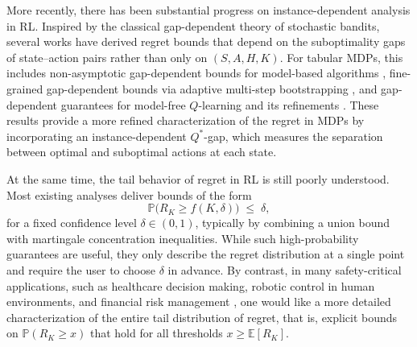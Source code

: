 \documentclass[11pt]{article}
\newcommand{\E} {\mathbb{E}}
\newcommand{\PP}{\mathbb{P}}
\begin{document}
More recently, there has been substantial progress on instance-dependent analysis in RL. Inspired by the classical gap-dependent theory of stochastic bandits, several works have derived regret bounds that depend on the suboptimality gaps of state--action pairs rather than only on $(S,A,H,K)$. For tabular MDPs, this includes non-asymptotic gap-dependent bounds for model-based algorithms \citep{simchowitz2019non}, fine-grained gap-dependent bounds via adaptive multi-step bootstrapping \citep{xu2021fine}, and gap-dependent guarantees for model-free $Q$-learning and its refinements \citep{yang2021q,velegkas2022reinforcement,zheng2025gap}. These results provide a more refined characterization of the regret in MDPs by incorporating an instance-dependent $Q^*$-gap, which measures the separation between optimal and suboptimal actions at each state.

At the same time, the tail behavior of regret in RL is still poorly understood. Most existing analyses deliver bounds of the form
\[
\PP\!\big(R_K \geq f(K,\delta)\big) \;\leq\; \delta,
\]
for a fixed confidence level $\delta \in (0,1)$, typically by combining a union bound with martingale concentration inequalities. While such high-probability guarantees are useful, they only describe the regret distribution at a single point and require the user to choose $\delta$ in advance. By contrast, in many safety-critical applications, such as healthcare decision making, robotic control in human environments, and financial risk management \cite{inamdar2024comprehensive}, one would like a more detailed characterization of the entire tail distribution of regret, that is, explicit bounds on $\PP(R_K \geq x)$ that hold for all thresholds $x \ge \E[R_K]$. 
\end{document}
